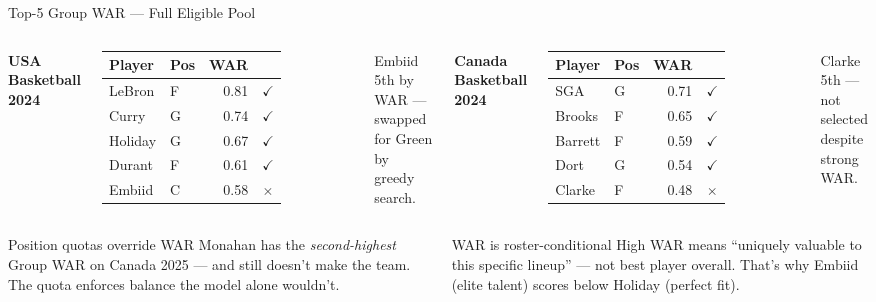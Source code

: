 \documentclass[aspectratio=169,11pt]{beamer}
\newcommand{\good}[1]{\textcolor{bgrn}{\textbf{#1}}}
\newcommand{\bad}[1]{\textcolor{bred}{\textbf{#1}}}
\begin{document}
\begin{frame}{Top-5 Group WAR — Full Eligible Pool}
\begin{columns}[T]
\textbf{\small USA Basketball 2024}
\vspace{0.2em}
\scriptsize\begin{tabular}{@{}llrc@{}}
\toprule
Player & Pos & WAR & \\
\midrule
LeBron   & F & 0.81 & \good{$\checkmark$} \\
Curry    & G & 0.74 & \good{$\checkmark$} \\
Holiday  & G & 0.67 & \good{$\checkmark$} \\
Durant   & F & 0.61 & \good{$\checkmark$} \\
Embiid   & C & 0.58 & \bad{$\times$} \\
\bottomrule
\end{tabular}
\vspace{0.3em}

{\scriptsize\color{steel}Embiid 5th by WAR — swapped\\for Green by greedy search.}

\textbf{\small Canada Basketball 2024}
\vspace{0.2em}
\scriptsize\begin{tabular}{@{}llrc@{}}
\toprule
Player & Pos & WAR & \\
\midrule
SGA      & G & 0.71 & \good{$\checkmark$} \\
Brooks   & F & 0.65 & \good{$\checkmark$} \\
Barrett  & F & 0.59 & \good{$\checkmark$} \\
Dort     & G & 0.54 & \good{$\checkmark$} \\
Clarke   & F & 0.48 & \bad{$\times$} \\
\bottomrule
\end{tabular}
\vspace{0.3em}

{\scriptsize\color{steel}Clarke 5th — not selected\\despite strong WAR.}

\end{columns}

\vspace{0.5em}
\begin{columns}[c]
\begin{alertblock}{Position quotas override WAR}
  \small Monahan has the \emph{second-highest} Group WAR on Canada 2025 — and still doesn't make the team. The quota enforces balance the model alone wouldn't.
\end{alertblock}
\begin{exampleblock}{WAR is roster-conditional}
  \small High WAR means ``uniquely valuable to this specific lineup'' — not best player overall. That's why Embiid (elite talent) scores below Holiday (perfect fit).
\end{exampleblock}
\end{columns}
\end{frame}
\end{document}
